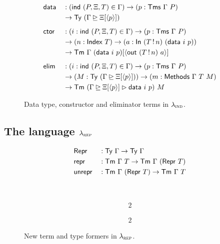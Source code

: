 \begin{figure}[H]
  \begin{alignat*}{2}
  & \textsf{data} &&: (\textsf{ind}\ (P, \Xi, T) \in \Gamma) \to (p : \textsf{Tms}\ \Gamma\ P) \\ 
  &            && \to \textsf{Ty}\ (\Gamma \unrhd \Xi[\langle p \rangle]) \\[0.5em]
  & \textsf{ctor} &&: (i : \textsf{ind}\ (P, \Xi, T) \in \Gamma) \to (p : \textsf{Tms}\ \Gamma\ P) \\
  &            && \to (n : \textsf{Index}\ T) \to (a : \textsf{In}\ (T \, ! \, n)\ (\textsf{data}\ i\ p)) \\
  &            && \to \textsf{Tm}\ \Gamma\ (\textsf{data}\ i\ p) [\langle \textsf{out}\ (T\,!\,n)\ a \rangle] \\[0.5em]
  & \textsf{elim} &&: (i : \textsf{ind}\ (P, \Xi, T) \in \Gamma) \to (p : \textsf{Tms}\ \Gamma\ P) \\
  &            && \to (M : \textsf{Ty}\ (\Gamma \unrhd \Xi[\langle p \rangle])) \to (m : \textsf{Methods}\ \Gamma\ T\ M) \\
  &            && \to \textsf{Tm}\ (\Gamma \unrhd \Xi[\langle p \rangle] \rhd \textsf{data}\ i\ p)\ M
  \end{alignat*}
  \caption{Data type, constructor and eliminator terms in $\lambda_{\textsc{ind}}$.}
  \label{fig:lambdaind-data-ctor}
\end{figure}

\subsection{The language $\lambda_{\textsc{rep}}$}

\begin{figure}[H]
  \begin{minipage}[t]{\textwidth}%
  \begin{alignat*}{2}
  & \textsf{Repr} &&: \textsf{Ty}\ \Gamma \to \textsf{Ty}\ \Gamma \\
  & \textsf{repr} &&: \textsf{Tm}\ \Gamma\ T \to \textsf{Tm}\ \Gamma\ (\textsf{Repr}\ T) \\
  & \textsf{unrepr} &&: \textsf{Tm}\ \Gamma\ (\textsf{Repr}\ T) \to \textsf{Tm}\ \Gamma\ T
  \end{alignat*}
  \end{minipage}\\
  \begin{minipage}[t]{0.5\textwidth}%
  \begin{alignat*}{2}
  \end{alignat*}
  \end{minipage}%
  \begin{minipage}[t]{0.5\textwidth}%
  \begin{alignat*}{2}
  \end{alignat*}
  \end{minipage}%
  \caption{New term and type formers in $\lambda_{\textsc{rep}}$.}
  \label{fig:lambdarep-new-formers}
\end{figure}


